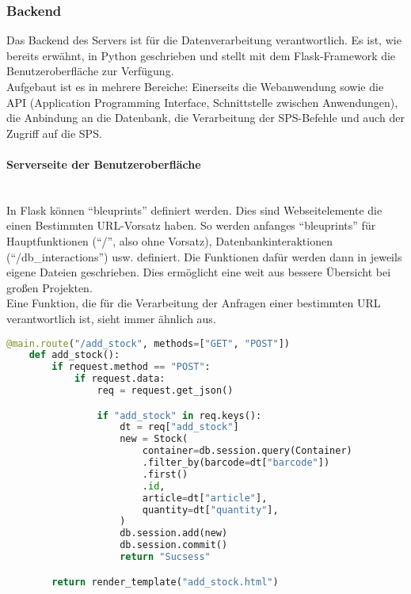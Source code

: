 \subsubsection{Backend}
Das Backend des Servers ist für die Datenverarbeitung verantwortlich. Es ist, wie bereits erwähnt, in Python geschrieben und stellt mit dem Flask-Framework die Benutzeroberfläche zur Verfügung. \\
Aufgebaut ist es in mehrere Bereiche: Einerseits die Webanwendung sowie die API (Application Programming Interface, Schnittstelle zwischen Anwendungen), die Anbindung an die Datenbank, die Verarbeitung der SPS-Befehle und auch der Zugriff auf die SPS.



\paragraph{Serverseite der Benutzeroberfläche}\mbox{}\\
In Flask können \enquote{bleuprints} definiert werden. Dies sind Webseitelemente die einen Bestimmten URL-Vorsatz haben. So werden anfanges \enquote{bleuprints}  für Hauptfunktionen (\enquote{/}, also ohne Vorsatz), Datenbankinteraktionen (\enquote{/db\_interactions}) usw. definiert. Die Funktionen dafür werden dann in jeweils eigene Dateien geschrieben. Dies ermöglicht eine weit aus bessere Übersicht bei großen Projekten. \\
Eine Funktion, die für die Verarbeitung der Anfragen einer bestimmten URL verantwortlich ist, sieht immer ähnlich aus.

\begin{lstlisting}[language=Python, caption=Blueprint Beispiel]
    @main.route("/add_stock", methods=["GET", "POST"])
    def add_stock():
        if request.method == "POST":
            if request.data:
                req = request.get_json()

                if "add_stock" in req.keys():
                    dt = req["add_stock"]
                    new = Stock(
                        container=db.session.query(Container)
                        .filter_by(barcode=dt["barcode"])
                        .first()
                        .id,
                        article=dt["article"],
                        quantity=dt["quantity"],
                    )
                    db.session.add(new)
                    db.session.commit()
                    return "Sucsess"

        return render_template("add_stock.html")
\end{lstlisting}  


